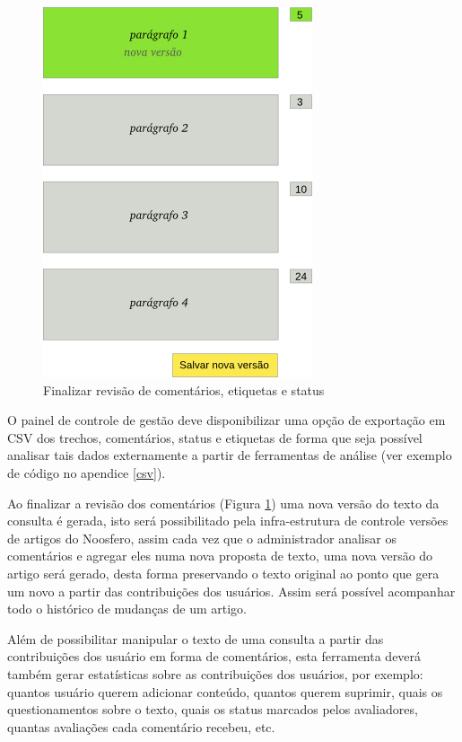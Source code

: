 \documentclass[12pt]{article}
\begin{document}
\begin{figure}[h]
\center
\includegraphics[scale=0.3]{manage-comments-commit.png}
\caption{Finalizar revisão de comentários, etiquetas e status}
\label{manage-comments-commit}
\end{figure}

O painel de controle de gestão deve disponibilizar uma opção de exportação em
CSV dos trechos, comentários, status e etiquetas de forma que seja possível
analisar tais dados externamente a partir de ferramentas de análise (ver
exemplo de código no apendice \ref{csv}).

Ao finalizar a revisão dos comentários (Figura \ref{manage-comments-commit}) uma
nova versão do texto da consulta é gerada, isto será possibilitado pela
infra-estrutura de controle versões de artigos do Noosfero, assim cada vez que
o administrador analisar os comentários e agregar eles numa nova proposta de
texto, uma nova versão do artigo será gerado, desta forma preservando o
texto original ao ponto que gera um novo a partir das contribuições dos
usuários. Assim será possível acompanhar todo o histórico de mudanças de um
artigo.

Além de possibilitar manipular o texto de uma consulta a partir das
contribuições dos usuário em forma de comentários, esta ferramenta deverá
também gerar estatísticas sobre as contribuições dos usuários, por
exemplo: quantos usuário querem adicionar conteúdo, quantos querem suprimir,
quais os questionamentos sobre o texto, quais os status marcados pelos
avaliadores, quantas avaliações cada comentário recebeu, etc.
\end{document}
